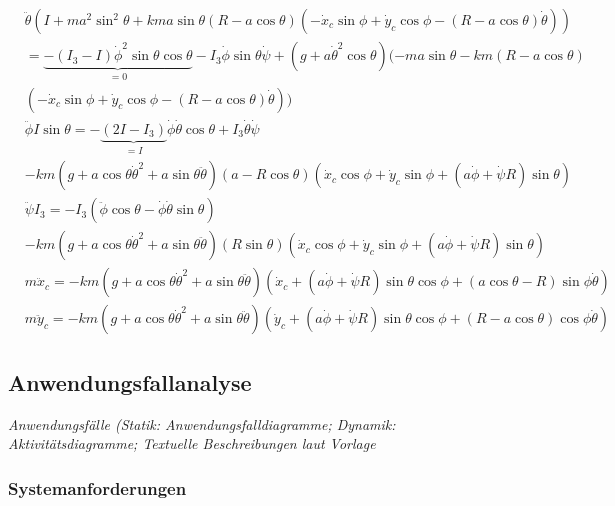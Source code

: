 {\begin{align*}
	&
	\ddot \theta (I+ma^2\sin^2\theta+kma\sin \theta(R-a\cos\theta)(-\dot x_c
	\sin\phi+\dot y_c \cos \phi-(R-a\cos\theta)\dot \theta))
	\\&
	=\underbrace{-(I_3-I)\dot \phi^2\sin\theta\cos\theta}_{=0}-I_3\dot \phi \sin \theta \dot \psi 
	+ (g+a\dot \theta^2\cos \theta)(-ma\sin\theta - km(R-a\cos \theta)
	\\&
	(-\dot x_c \sin \phi +\dot y_c \cos \phi-(R-a\cos\theta)\dot \theta))
\end{align*}
\begin{align*}
	&
	\ddot \phi I \sin\theta= -\underbrace{(2I-I_3)}_{=I}
	\dot \phi \dot \theta \cos \theta + I_3\dot \theta \dot \psi
	\\&
	-km(g+a\cos\theta\dot\theta^2+a\sin\theta\ddot\theta)
	(a-R\cos\theta)(\dot x_c\cos \phi +\dot y_c \sin\phi+
	(a\dot \phi+\dot \psi R)\sin \theta)
\end{align*}
\begin{align*}
	&\ddot \psi I_3=-I_3(\ddot \phi \cos \theta - \dot \phi \dot \theta \sin \theta)
	\\&
	-km(g+a\cos\theta\dot\theta^2+a \sin\theta\ddot \theta)(R\sin\theta)
	(\dot x_c\cos \phi +\dot y_c \sin \phi+(a\dot \phi +\dot \psi R)\sin\theta)
\end{align*}
\begin{align*}
	&m\ddot x_c=-km(g+a\cos\theta\dot \theta^2+a\sin \theta\ddot\theta)
	(\dot x_c+(a\dot \phi + \dot \psi R)\sin \theta\cos \phi+
	(a\cos \theta -R)\sin \phi \dot \theta)
\end{align*}
\begin{align*}
	&m\ddot y_c=-km(g+a\cos \theta\dot \theta^2+a \sin \theta \ddot \theta)
	(\dot y_c+(a\dot \phi + \dot \psi R)\sin \theta \cos \phi
	+(R-a\cos \theta)\cos\phi \dot \theta)
\end{align*} }

\subsection{Anwendungsfallanalyse}

{\em Anwendungsf\"alle (Statik: Anwendungsfalldiagramme; Dynamik: 
Aktivit\"atsdiagramme; Textuelle Beschreibungen laut Vorlage}

\subsubsection{Systemanforderungen}

